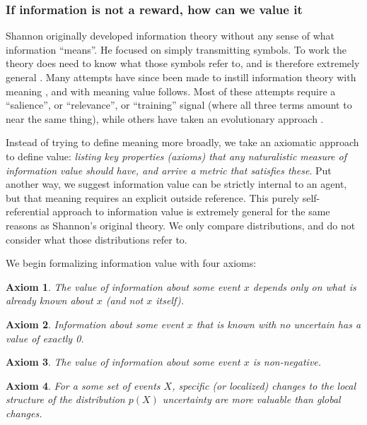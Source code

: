 \documentclass[9pt,twocolumn,twoside]{pnas-new}
\newtheorem{axiom}{Axiom}
\begin{document}
    
\subsubsection*{If information is not a reward, how can we value it}
Shannon originally developed information theory without any sense of what information ``means''. He focused on simply transmitting symbols. To work the theory does need to know what those symbols refer to, and is therefore extremely general \citep{Shannon1948}. Many attempts have since been made to instill information theory with meaning \citep{Kolchinsky2018}, and with meaning value follows. Most of these attempts require a ``salience'', or ``relevance'', or ``training'' signal (where all three terms amount to near the same thing), while others have taken an evolutionary approach \citep{Kolchinsky2018}.  

Instead of trying to define meaning more broadly, we take an axiomatic approach to define value: \textit{listing key properties (axioms) that any naturalistic measure of information value should have, and arrive a metric that satisfies these}. Put another way, we suggest information value can be strictly internal to an agent, but that meaning requires an explicit outside reference. This purely self-referential approach to information value is extremely general for the same reasons as Shannon's original theory. We only compare distributions, and do not consider what those distributions refer to.

We begin formalizing information value with four axioms:

\begin{axiom}
    The value of information about some event $x$ depends \textit{only} on what is already known about $x$ (and not $x$ itself).    
    \label{ax:1}
\end{axiom}
\begin{axiom}
    Information about some event $x$ that is known with no uncertain has a value of exactly 0.
    \label{ax:2}
\end{axiom}
\begin{axiom}
    The value of information about some event $x$ is non-negative. 
    \label{ax:3}
\end{axiom}
\begin{axiom}
    For a some set of events $X$, specific (or localized) changes to the local structure of the distribution $p(X)$ uncertainty are more valuable than global changes.
    \label{ax:4}
\end{axiom}
\end{document}
